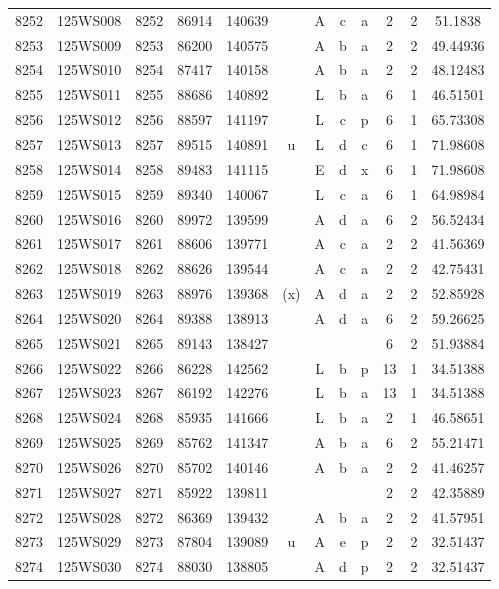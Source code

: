 \begin{tabular}{|*{12}{c|}}
8252 & 125WS008 & 8252 & 86914 & 140639 &  & A & c & a & 2 & 2 & 51.1838 \\ 
8253 & 125WS009 & 8253 & 86200 & 140575 &  & A & b & a & 2 & 2 & 49.44936 \\ 
8254 & 125WS010 & 8254 & 87417 & 140158 &  & A & b & a & 2 & 2 & 48.12483 \\ 
8255 & 125WS011 & 8255 & 88686 & 140892 &  & L & b & a & 6 & 1 & 46.51501 \\ 
8256 & 125WS012 & 8256 & 88597 & 141197 &  & L & c & p & 6 & 1 & 65.73308 \\ 
8257 & 125WS013 & 8257 & 89515 & 140891 & u & L & d & c & 6 & 1 & 71.98608 \\ 
8258 & 125WS014 & 8258 & 89483 & 141115 &  & E & d & x & 6 & 1 & 71.98608 \\ 
8259 & 125WS015 & 8259 & 89340 & 140067 &  & L & c & a & 6 & 1 & 64.98984 \\ 
8260 & 125WS016 & 8260 & 89972 & 139599 &  & A & d & a & 6 & 2 & 56.52434 \\ 
8261 & 125WS017 & 8261 & 88606 & 139771 &  & A & c & a & 2 & 2 & 41.56369 \\ 
8262 & 125WS018 & 8262 & 88626 & 139544 &  & A & c & a & 2 & 2 & 42.75431 \\ 
8263 & 125WS019 & 8263 & 88976 & 139368 & (x) & A & d & a & 2 & 2 & 52.85928 \\ 
8264 & 125WS020 & 8264 & 89388 & 138913 &  & A & d & a & 6 & 2 & 59.26625 \\ 
8265 & 125WS021 & 8265 & 89143 & 138427 &  &  &  &  & 6 & 2 & 51.93884 \\ 
8266 & 125WS022 & 8266 & 86228 & 142562 &  & L & b & p & 13 & 1 & 34.51388 \\ 
8267 & 125WS023 & 8267 & 86192 & 142276 &  & L & b & a & 13 & 1 & 34.51388 \\ 
8268 & 125WS024 & 8268 & 85935 & 141666 &  & L & b & a & 2 & 1 & 46.58651 \\ 
8269 & 125WS025 & 8269 & 85762 & 141347 &  & A & b & a & 6 & 2 & 55.21471 \\ 
8270 & 125WS026 & 8270 & 85702 & 140146 &  & A & b & a & 2 & 2 & 41.46257 \\ 
8271 & 125WS027 & 8271 & 85922 & 139811 &  &  &  &  & 2 & 2 & 42.35889 \\ 
8272 & 125WS028 & 8272 & 86369 & 139432 &  & A & b & a & 2 & 2 & 41.57951 \\ 
8273 & 125WS029 & 8273 & 87804 & 139089 & u & A & e & p & 2 & 2 & 32.51437 \\ 
8274 & 125WS030 & 8274 & 88030 & 138805 &  & A & d & p & 2 & 2 & 32.51437 \\ 

\end{tabular}
